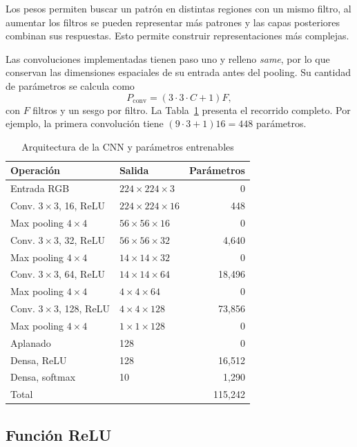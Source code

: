 \documentclass[conference]{IEEEtran}
\begin{document}
Los pesos  permiten buscar un patrón en distintas regiones con un mismo filtro, al aumentar los filtros se pueden representar más patrones y las capas posteriores combinan sus respuestas. Esto permite construir representaciones más complejas.

Las convoluciones implementadas tienen paso uno y relleno \textit{same}, por lo que conservan las dimensiones espaciales de su entrada antes del pooling. Su cantidad de parámetros se calcula como
\begin{equation}
P_{\mathrm{conv}}=(3\cdot3\cdot C+1)F,
\label{eq:parametros}
\end{equation}
con $F$ filtros y un sesgo por filtro. La Tabla~\ref{tab:arquitectura} presenta el recorrido completo. Por ejemplo, la primera convolución tiene $(9\cdot3+1)16=448$ parámetros.

\begin{table}[!htbp]
\caption{Arquitectura de la CNN y parámetros entrenables}
\label{tab:arquitectura}
\centering
\scriptsize
\setlength{\tabcolsep}{3pt}
\begin{tabular}{llr}
\toprule
Operación & Salida & Parámetros \\
\midrule
Entrada RGB & $224\times224\times3$ & 0 \\
Conv. $3\times3$, 16, ReLU & $224\times224\times16$ & 448 \\
Max pooling $4\times4$ & $56\times56\times16$ & 0 \\
Conv. $3\times3$, 32, ReLU & $56\times56\times32$ & 4,640 \\
Max pooling $4\times4$ & $14\times14\times32$ & 0 \\
Conv. $3\times3$, 64, ReLU & $14\times14\times64$ & 18,496 \\
Max pooling $4\times4$ & $4\times4\times64$ & 0 \\
Conv. $3\times3$, 128, ReLU & $4\times4\times128$ & 73,856 \\
Max pooling $4\times4$ & $1\times1\times128$ & 0 \\
Aplanado & 128 & 0 \\
Densa, ReLU & 128 & 16,512 \\
Densa, softmax & 10 & 1,290 \\
\midrule
Total & & 115,242 \\
\bottomrule
\end{tabular}
\end{table}

\subsection{Función ReLU}
\end{document}
